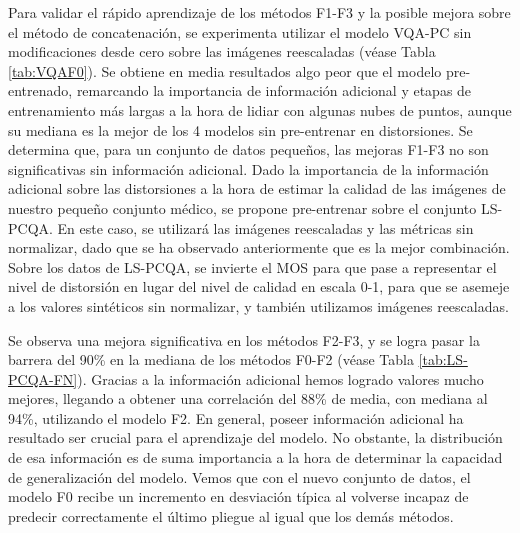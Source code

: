 Para validar el rápido aprendizaje de los métodos F1-F3 y la posible mejora 
sobre el método de concatenación, se experimenta utilizar el modelo VQA-PC sin 
modificaciones desde cero sobre las imágenes reescaladas (véase Tabla \ref{tab:VQAF0}).
Se obtiene en media resultados algo peor que el modelo 
pre-entrenado, remarcando la importancia de información adicional y etapas 
de entrenamiento más largas a la hora de lidiar con algunas nubes de puntos, aunque su
mediana es la mejor de los 4 modelos sin pre-entrenar en distorsiones. 
Se determina que, para un conjunto de datos pequeños, las mejoras F1-F3 no son significativas sin información adicional. 
Dado la importancia de la información adicional sobre las distorsiones a la 
hora de estimar la calidad de las imágenes de nuestro pequeño conjunto médico, 
se propone pre-entrenar sobre el conjunto LS-PCQA.
En este caso, se utilizará las imágenes reescaladas y las métricas sin normalizar, 
dado que se ha observado anteriormente que es la mejor combinación. Sobre los 
datos de LS-PCQA, se invierte el MOS para que pase a representar el nivel 
de distorsión en lugar del nivel de calidad en escala 0-1, para que se asemeje a los 
valores sintéticos sin normalizar, y también utilizamos imágenes reescaladas.

Se observa una mejora significativa en los métodos F2-F3, y se logra 
pasar la barrera del 90\% en la mediana de los métodos F0-F2 (véase Tabla \ref{tab:LS-PCQA-FN}).
Gracias a la información adicional hemos logrado valores mucho mejores, llegando a 
obtener una correlación del 88\% de media, con mediana al 94\%, utilizando el modelo F2. 
En general, poseer información adicional ha resultado ser crucial para el aprendizaje 
del modelo. No obstante, la distribución de esa información es de suma importancia a la 
hora de determinar la capacidad de generalización del modelo. Vemos que con el nuevo 
conjunto de datos, el modelo F0 recibe un incremento en desviación típica al
volverse incapaz de predecir correctamente el último pliegue al igual que los demás métodos.  

